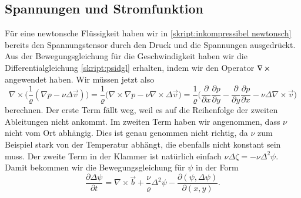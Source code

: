 \subsection{Spannungen und Stromfunktion}
Für eine newtonsche Flüssigkeit haben wir in 
\eqref{skript:inkompressibel newtonsch}
bereits den Spannungstensor durch den Druck und die Spannungen
ausgedrückt.
Aus der Bewegungsgleichung für die Geschwindigkeit haben wir die
Differentialgleichung \eqref{skript:psidgl} erhalten, indem
wir den Operator $\nabla\times\mathstrut$ angewendet haben.
Wir müssen jetzt also 
\[
\nabla\times\biggl(\frac1{\varrho}(\nabla p-\nu\Delta\vec{v})\biggr)
=
\frac{1}{\varrho}
\biggl(
\nabla\times\nabla p
-
\nu \nabla\times\Delta\vec{v}
\biggr)
=
\frac1{\varrho}
\biggl(
\frac{\partial}{\partial x}\frac{\partial p}{\partial y}
-
\frac{\partial}{\partial y}\frac{\partial p}{\partial x}
-\nu\Delta\nabla\times\vec{v}
\biggr)
\]
berechnen.
Der erste Term fällt weg, weil es auf die Reihenfolge der zweiten
Ableitungen nicht ankommt.
Im zweiten Term haben wir angenommen, dass $\nu$ nicht vom Ort
abhängig.
Dies ist genau genommen nicht richtig, da $\nu$ zum Beispiel
stark von der Temperatur abhängt, die ebenfalls nicht konstant sein
muss.
Der zweite Term in der Klammer ist natürlich einfach
$\nu\Delta\zeta=-\nu\Delta^2\psi$.
Damit bekommen wir die Bewegungsgleichung für $\psi$ in der Form
\begin{equation}
\frac{\partial \Delta \psi}{\partial t}
=
\nabla\times\vec b
+\frac{\nu}{\varrho}\Delta^2\psi
-\frac{\partial(\psi,\Delta\psi)}{\partial(x,y)}.
\label{skript:psidgl2}
\end{equation}


